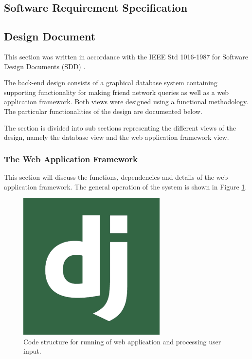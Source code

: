 \documentclass[10pt,onecolumn]{article}
\begin{document}
	\subsection{Software Requirement Specification} %

	\subsection{Design Document} %
	This section was written in accordance with the IEEE Std 1016-1987 for Software Design Documents (SDD) \cite{IEEE}. 
	
	The back-end design consists of a graphical database system containing supporting functionality for making friend network queries as well as a web application framework. Both views were designed using a functional methodology. The particular functionalities of the design are documented below.
	
	The section is divided into sub sections representing the different views of the design, namely the database view and the web application framework view.
	
	\subsubsection{The Web Application Framework}
	This section will discuss the functions, dependencies and details of the web application framework. The general operation of the system is shown in Figure \ref{fig:django}.
	
		\begin{figure}[htb] 
			\centering
			\includegraphics[scale=1]{django}
			\caption{Code structure for running of web application and processing user input.} \label{fig:django}
		\end{figure}
		
\end{document}
